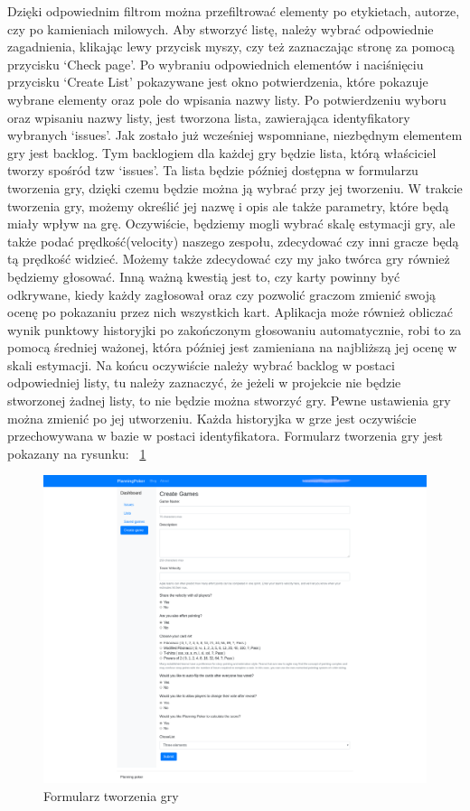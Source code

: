 Dzięki odpowiednim filtrom można przefiltrować elementy po etykietach, autorze, czy po kamieniach milowych.
Aby stworzyć listę, należy wybrać odpowiednie zagadnienia,
klikając lewy przycisk myszy, czy też zaznaczając stronę za pomocą przycisku `Check page'.
Po wybraniu odpowiednich elementów i naciśnięciu przycisku `Create List' pokazywane jest okno potwierdzenia,
które pokazuje wybrane elementy oraz pole do wpisania nazwy listy.
Po potwierdzeniu wyboru oraz wpisaniu nazwy listy, jest tworzona lista, zawierająca identyfikatory wybranych `issues'.
Jak zostało już wcześniej wspomniane, niezbędnym elementem gry jest backlog.
Tym backlogiem dla każdej gry będzie lista, którą właściciel tworzy spośród tzw `issues'.
Ta lista będzie później dostępna w formularzu tworzenia gry,
dzięki czemu będzie można ją wybrać przy jej tworzeniu.
W trakcie tworzenia gry, możemy określić jej nazwę i opis ale także parametry, które będą miały wpływ na grę.
Oczywiście, będziemy mogli wybrać skalę estymacji gry, ale także podać prędkość(velocity) naszego zespołu,
zdecydować czy inni gracze będą tą prędkość widzieć.
Możemy także zdecydować czy my jako twórca gry również będziemy głosować.
Inną ważną kwestią jest to, czy karty powinny być odkrywane, kiedy każdy zagłosował
oraz czy pozwolić graczom zmienić swoją ocenę po pokazaniu przez nich wszystkich kart.
Aplikacja może również obliczać wynik punktowy historyjki po zakończonym głosowaniu automatycznie,
robi to za pomocą średniej ważonej, która później jest zamieniana na najbliższą jej ocenę w skali estymacji.
Na końcu oczywiście należy wybrać backlog w postaci odpowiedniej listy, tu należy zaznaczyć,
że jeżeli w projekcie nie będzie stworzonej żadnej listy, to nie będzie można stworzyć gry.
Pewne ustawienia gry można zmienić po jej utworzeniu.
Każda historyjka w grze jest oczywiście przechowywana w bazie w postaci identyfikatora.
Formularz tworzenia gry jest pokazany na rysunku: 
~\ref{rys:form} 

\begin{figure}[H]
	\centering\includegraphics[width=.7\textwidth]{img/Formularz}
	\caption{Formularz tworzenia gry}\label{rys:form}%
\end{figure}

